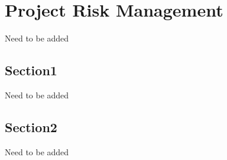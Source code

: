 \chapter{Project Risk Management}
Need to be added
\section{Section1}
Need to be added
\section{Section2}
Need to be added

\FloatBarrier
\newpage